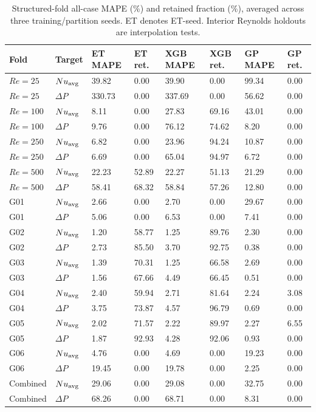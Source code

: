 \begin{table}[htbp]\centering\scriptsize\caption{Structured-fold all-case MAPE (\%) and retained fraction (\%), averaged across three training/partition seeds. ET denotes ET-seed. Interior Reynolds holdouts are interpolation tests.}\label{tab:structured}
\begin{tabular}{llllllll}\toprule
Fold & Target & ET MAPE & ET ret. & XGB MAPE & XGB ret. & GP MAPE & GP ret.\\\midrule
$Re=25$ & $Nu_{\rm avg}$ & 39.82 & 0.00 & 39.90 & 0.00 & 99.34 & 0.00\\
$Re=25$ & $\Delta P$ & 330.73 & 0.00 & 337.69 & 0.00 & 56.62 & 0.00\\
$Re=100$ & $Nu_{\rm avg}$ & 8.11 & 0.00 & 27.83 & 69.16 & 43.01 & 0.00\\
$Re=100$ & $\Delta P$ & 9.76 & 0.00 & 76.12 & 74.62 & 8.20 & 0.00\\
$Re=250$ & $Nu_{\rm avg}$ & 6.82 & 0.00 & 23.96 & 94.24 & 10.87 & 0.00\\
$Re=250$ & $\Delta P$ & 6.69 & 0.00 & 65.04 & 94.97 & 6.72 & 0.00\\
$Re=500$ & $Nu_{\rm avg}$ & 22.23 & 52.89 & 22.27 & 51.13 & 21.29 & 0.00\\
$Re=500$ & $\Delta P$ & 58.41 & 68.32 & 58.84 & 57.26 & 12.80 & 0.00\\
G01 & $Nu_{\rm avg}$ & 2.66 & 0.00 & 2.70 & 0.00 & 29.67 & 0.00\\
G01 & $\Delta P$ & 5.06 & 0.00 & 6.53 & 0.00 & 7.41 & 0.00\\
G02 & $Nu_{\rm avg}$ & 1.20 & 58.77 & 1.25 & 89.76 & 2.30 & 0.00\\
G02 & $\Delta P$ & 2.73 & 85.50 & 3.70 & 92.75 & 0.38 & 0.00\\
G03 & $Nu_{\rm avg}$ & 1.39 & 70.31 & 1.25 & 66.58 & 2.69 & 0.00\\
G03 & $\Delta P$ & 1.56 & 67.66 & 4.49 & 66.45 & 0.51 & 0.00\\
G04 & $Nu_{\rm avg}$ & 2.40 & 59.94 & 2.71 & 81.64 & 2.24 & 3.08\\
G04 & $\Delta P$ & 3.75 & 73.87 & 4.57 & 96.79 & 0.69 & 0.00\\
G05 & $Nu_{\rm avg}$ & 2.02 & 71.57 & 2.22 & 89.97 & 2.27 & 6.55\\
G05 & $\Delta P$ & 1.87 & 92.93 & 4.28 & 92.06 & 0.93 & 0.00\\
G06 & $Nu_{\rm avg}$ & 4.76 & 0.00 & 4.69 & 0.00 & 19.23 & 0.00\\
G06 & $\Delta P$ & 19.45 & 0.00 & 19.78 & 0.00 & 2.25 & 0.00\\
Combined & $Nu_{\rm avg}$ & 29.06 & 0.00 & 29.08 & 0.00 & 32.75 & 0.00\\
Combined & $\Delta P$ & 68.26 & 0.00 & 68.71 & 0.00 & 8.31 & 0.00\\
\bottomrule\end{tabular}\end{table}
